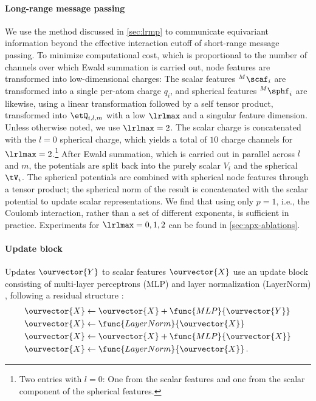 \documentclass[10pt]{article}
\begin{document}
\paragraph{Long-range message passing} We use the method discussed in \cref{sec:lrmp} to communicate equivariant information beyond the effective interaction cutoff of short-range message passing. To minimize computational cost, which is proportional to the number of channels over which Ewald summation is carried out, node features are transformed into low-dimensional charges: The scalar features ${}^M\scaf_i$ are transformed into a single per-atom charge $q_i$, and spherical features ${}^M\sphf_i$ are likewise, using a linear transformation followed by a self tensor product, transformed into $\etQ_{i,l,m}$ with a low $\lrlmax$ and a singular feature dimension. Unless otherwise noted, we use $\lrlmax=2$. The scalar charge is concatenated with the $l=0$ spherical charge, which yields a total of $10$ charge channels for $\lrlmax=2$.\footnote{Two entries with $l{=}0$: One from the scalar features and one from the scalar component of the spherical features.}
After Ewald summation, which is carried out in parallel across $l$ and $m$, the potentials are split back into the purely scalar $V_i$ and the spherical $\tV_i$. The spherical potentials are combined with spherical node features through a tensor product; the spherical norm of the result is concatenated with the scalar potential to update scalar representations.
We find that using only $p{=}1$, i.e., the Coulomb interaction, rather than a set of different exponents, is sufficient in practice. Experiments for $\lrlmax=0,1,2$ can be found in \cref{sec:apx-ablations}.


\paragraph{Update block} Updates $\ourvector{Y}$ to scalar features $\ourvector{X}$ use an update block consisting of multi-layer perceptrons (MLP) and layer normalization (LayerNorm) \citep{bkh2016}, following a residual structure \citep{hzrs2015}:
\begin{align}
  \ourvector{X} &\leftarrow \ourvector{X} + \func{MLP}{\ourvector{Y}} \nonumber\\
  \ourvector{X} &\leftarrow \func{LayerNorm}{\ourvector{X}} \nonumber\\
  \ourvector{X} &\leftarrow \ourvector{X} + \func{MLP}{\ourvector{X}} \nonumber\\
  \ourvector{X} &\leftarrow \func{LayerNorm}{\ourvector{X}} \nonumber \, .
\end{align}
\end{document}
